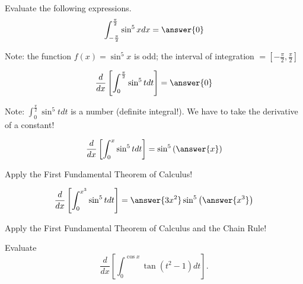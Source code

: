 \documentclass{ximera}
\author{Nela Lakos \and Kyle Parsons}
\begin{document}
\begin{exercise}

Evaluate the following expressions.
\begin{align*}
\int_{-\frac{\pi}{2}}^\frac{\pi}{2} \sin^5 x dx &= \answer{0}\\
\end{align*}
\begin{hint}
Note: the function $f(x)= \sin^5 x$ is odd; the interval of integration $=[-\frac{\pi}{2},\frac{\pi}{2}]$
\end{hint}
\begin{align*}
\frac{d}{dx}\left[\int_0^\frac{\pi}{2} \sin^5 t dt\right] &= \answer{0}\\
\end{align*}
\begin{hint}
Note: $\int_0^\frac{\pi}{2} \sin^5 t dt$ is a number (definite integral!).  We have to take the derivative of a constant!
\end{hint}
\begin{align*}
\frac{d}{dx}\left[\int_0^{x} \sin^5 t dt\right] &= \sin^5\left(\answer{x}\right)\\
\end{align*}
\begin{hint}
Apply the First Fundamental Theorem of Calculus!
\end{hint}
\begin{align*}
\frac{d}{dx}\left[\int_0^{x^3} \sin^5 t dt\right] &= \answer{3x^2}\sin^5\left(\answer{x^3}\right)\\
\end{align*}
\begin{hint}
Apply the First Fundamental Theorem of Calculus and the Chain Rule!
\end{hint}
Evaluate
\[
\frac{d}{dx}\left[\int_0^{\cos x} \tan\left(t^2-1\right) dt\right].
\]

\begin{multipleChoice}
\end{multipleChoice}

\end{exercise}
\end{document}
